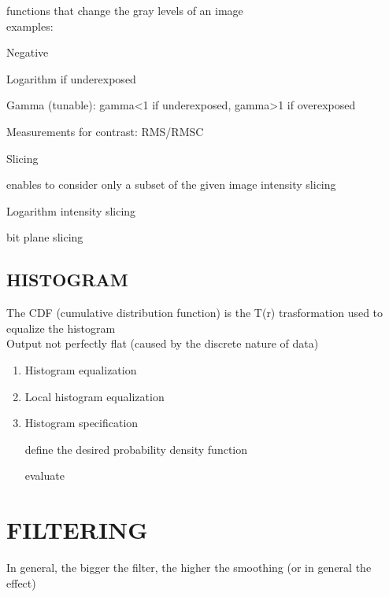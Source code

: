 \documentclass[11pt,english]{article}
\begin{document}
functions that change the gray levels of an image \\
examples: \par
    \makebox[1.5cm]{}  Negative\par
    \makebox[1.5cm]{}  Logarithm \makebox[0.5cm]{\textrightarrow} if underexposed \par
    \makebox[1.5cm]{} Gamma (tunable): \makebox[0.5cm]{\textrightarrow} gamma<1 if underexposed, \makebox[0.5cm]{\textrightarrow} gamma>1 if overexposed \par
\medskip
Measurements for contrast: RMS/RMSC

\medskip

Slicing \par
    \makebox[1.5cm]{\textrightarrow}  enables to consider only a subset of the given image
	intensity slicing\par
    \makebox[1.5cm]{\textrightarrow}  Logarithm \makebox[0.5cm]{\textrightarrow} intensity slicing \par
    \makebox[1.5cm]{\textrightarrow} bit plane slicing \par
[see graphs for: constrast strecthing, thresholding, intensity slicing x2]

\subsection{HISTOGRAM}
The CDF (cumulative distribution function) is the T(r) trasformation used to equalize the histogram \\
Output not perfectly flat (caused by the discrete nature of data)
\begin{enumerate}
    \item Histogram equalization
    \item Local histogram equalization
    \item Histogram specification \par
    \makebox[1.5cm]{\textrightarrow}  define the desired probability density function\par
    \makebox[1.5cm]{\textrightarrow} evaluate\par
\end{enumerate}

\section{FILTERING}

In general, the bigger the filter, the higher the smoothing (or in general the effect)
\end{document}
